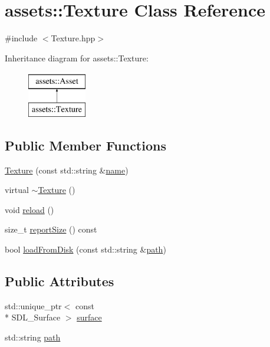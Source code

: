\hypertarget{classassets_1_1Texture}{\section{assets\-:\-:Texture Class Reference}
\label{classassets_1_1Texture}
}


{\ttfamily \#include $<$Texture.\-hpp$>$}

Inheritance diagram for assets\-:\-:Texture\-:\begin{figure}[H]
\begin{center}
\leavevmode
\includegraphics[height=2.000000cm]{classassets_1_1Texture}
\end{center}
\end{figure}
\subsection*{Public Member Functions}
\begin{DoxyCompactItemize}
\item 
\hyperlink{classassets_1_1Texture_acd15e6d37663043703f63eec5bb0da38}{Texture} (const std\-::string \&\hyperlink{classassets_1_1Asset_a57fe90e1aa9281f2dd59041dffcc74b4}{name})
\item 
virtual \hyperlink{classassets_1_1Texture_a6f6197d488303b0dba74505d84be445f}{$\sim$\-Texture} ()
\item 
void \hyperlink{classassets_1_1Texture_a41a2dc207c9e32a059814b910bd23d22}{reload} ()
\item 
size\-\_\-t \hyperlink{classassets_1_1Texture_a90ca4bef41960b8c260822d4486a0094}{report\-Size} () const 
\item 
bool \hyperlink{classassets_1_1Texture_a99fc9f5b054e5c9ff487a01399513c72}{load\-From\-Disk} (const std\-::string \&\hyperlink{classassets_1_1Texture_a22a5889e7d6fffc92301820fe561f8dc}{path})
\end{DoxyCompactItemize}
\subsection*{Public Attributes}
\begin{DoxyCompactItemize}
\item 
std\-::unique\-\_\-ptr$<$ const \\*
S\-D\-L\-\_\-\-Surface $>$ \hyperlink{classassets_1_1Texture_a88e1832541508cabf5e3856fa23a0b5d}{surface}
\item 
std\-::string \hyperlink{classassets_1_1Texture_a22a5889e7d6fffc92301820fe561f8dc}{path}
\end{DoxyCompactItemize}
